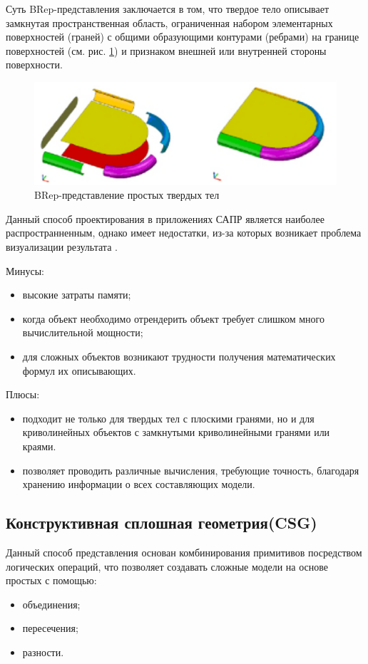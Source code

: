 Суть BRep-представления заключается в том, что твердое тело описывает замкнутая пространственная область,
ограниченная набором элементарных поверхностей (граней) с общими образующими  контурами (ребрами) на границе поверхностей (см. рис. \ref{fig:brep})
и признаком внешней или внутренней стороны поверхности.
\begin{figure}
  \centering
  \includegraphics[scale=0.6]{inc/img/brep}
  \caption{BRep-представление простых твердых тел}
  \label{fig:brep}
\end{figure}

Данный способ проектирования в приложениях САПР является наиболее распространненным, 
однако имеет недостатки, из-за которых возникает проблема визуализации результата \cite{main_modeling}.


Минусы: 
\begin{itemize} 
\item высокие затраты памяти;
\item когда объект необходимо отрендерить объект требует слишком много вычислительной мощности;
\item для сложных объектов возникают трудности получения математических формул их описывающих.  
\end{itemize}

Плюсы:
\begin{itemize}
  \item подходит не только для твердых тел с плоскими гранями, но и для криволинейных объектов с замкнутыми криволинейными гранями или краями.
  \item позволяет проводить различные вычисления, требующие точность, благодаря хранению информации о всех составляющих модели.
\end{itemize}

\subsection{Конструктивная сплошная геометрия(CSG)}\label{csg}
Данный способ представления основан комбинирования примитивов посредством логических операций,
что позволяет создавать сложные модели на основе простых с помощью:
\begin{itemize}
  \item объединения;
  \item пересечения;
  \item разности.
\end{itemize}

